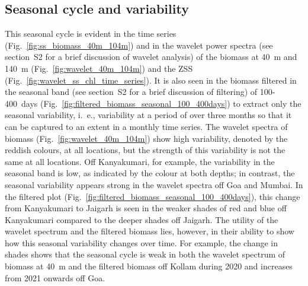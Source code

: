 \documentclass[authoryear,review,11pt]{elsarticle}
\newcommand{\chla}{chl-{\emph{a}}}
\begin{document}
%


\subsection{Seasonal cycle and variability}
\label{sec:seasonal.zss}

This seasonal cycle is evident in the time series (Fig.~\ref{fig:ss_biomass_40m_104m}) and in the wavelet power spectra (see section~S2 for a brief discussion of wavelet analysis) of the biomass at 40~m and 140~m (Fig.~\ref{fig:wavelet_40m_104m}) and the ZSS (Fig.~\ref{fig:wavelet_ss_chl_time_series}).  It is also seen in the biomass filtered in the seasonal band (see section~S2 for a brief discussion of filtering) of 100-400~days (Fig.~\ref{fig:filtered_biomass_seasonal_100_400days}) to extract only the seasonal variability, i.~e., variability at a period of over three months so that it can be captured to an extent in a monthly time series.  The wavelet spectra of biomass (Fig.~\ref{fig:wavelet_40m_104m}) show high variability, denoted by the reddish colours, at all locations, but the strength of this variability is not the same at all locations.  Off Kanyakumari, for example, the variability in the seasonal band is low, as indicated by the colour at both depths; in contrast, the seasonal variability appears strong in the wavelet spectra off Goa and Mumbai.  In the filtered plot (Fig.~\ref{fig:filtered_biomass_seasonal_100_400days}), this change from Kanyakumari to Jaigarh is seen in the weaker shades of red and blue off Kanyakumari compared to the deeper shades off Jaigarh. The utility of the wavelet spectrum and the filtered biomass lies, however, in their ability to show how this seasonal variability changes over time.  For example, the change in shades shows that the seasonal cycle is weak in both the wavelet spectrum of biomass at 40~m and the filtered biomass off Kollam during 2020 and increases from 2021 onwards off Goa. 
\end{document}

